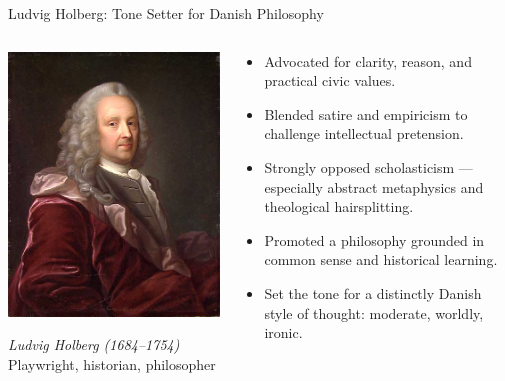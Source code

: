 \documentclass[fleqn]{beamer}
\begin{document}
\begin{frame}{Ludvig Holberg: Tone Setter for Danish Philosophy}

\begin{columns}
  \begin{column}{0.4\textwidth}
    \includegraphics[width=\linewidth]{holberg.jpg}  %

    \vspace{0.5em}
    \centering
    {\small\textit{Ludvig Holberg (1684–1754)}\\
    Playwright, historian, philosopher}
  \end{column}

  \begin{column}{0.6\textwidth}
    \begin{itemize}
      \item Advocated for clarity, reason, and practical civic values.
      \item Blended satire and empiricism to challenge intellectual pretension.
      \item Strongly opposed scholasticism — especially abstract metaphysics and theological hairsplitting.
      \item Promoted a philosophy grounded in common sense and historical learning.
      \item Set the tone for a distinctly Danish style of thought: moderate, worldly, ironic.
    \end{itemize}
  \end{column}
\end{columns}

\end{frame}
\end{document}
